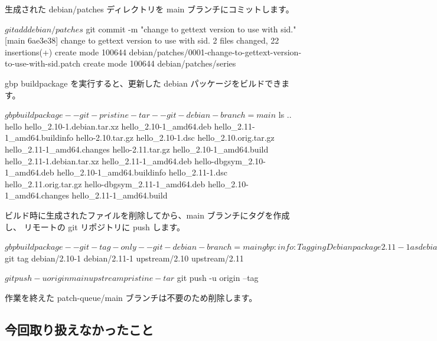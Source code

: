 \documentclass[mingoth,a4paper]{jsarticle}
\begin{document}
生成された debian/patches ディレクトリを main ブランチにコミットします。

\begin{commandline}
$ git add debian/patches
$ git commit -m "change to gettext version to use with sid."
[main 6ae3e38] change to gettext version to use with sid.
 2 files changed, 22 insertions(+)
 create mode 100644 debian/patches/0001-change-to-gettext-version-to-use-with-sid.patch
 create mode 100644 debian/patches/series
\end{commandline}

gbp buildpackage を実行すると、更新した debian パッケージをビルドできます。

\begin{commandline}
$ gbp buildpackage --git-pristine-tar --git-debian-branch=main

$ ls ..
hello                          hello_2.10-1.debian.tar.xz    hello_2.10-1_amd64.deb      hello_2.11-1_amd64.buildinfo
hello-2.10.tar.gz              hello_2.10-1.dsc              hello_2.10.orig.tar.gz      hello_2.11-1_amd64.changes
hello-2.11.tar.gz              hello_2.10-1_amd64.build      hello_2.11-1.debian.tar.xz  hello_2.11-1_amd64.deb
hello-dbgsym_2.10-1_amd64.deb  hello_2.10-1_amd64.buildinfo  hello_2.11-1.dsc            hello_2.11.orig.tar.gz
hello-dbgsym_2.11-1_amd64.deb  hello_2.10-1_amd64.changes    hello_2.11-1_amd64.build
\end{commandline}

ビルド時に生成されたファイルを削除してから、main ブランチにタグを作成し、
リモートの git リポジトリに push します。

\begin{commandline}
$ gbp buildpackage --git-tag-only --git-debian-branch=main
gbp:info: Tagging Debian package 2.11-1 as debian/2.11-1 in git

$ git tag
debian/2.10-1
debian/2.11-1
upstream/2.10
upstream/2.11
\end{commandline}

\begin{commandline}
$ git push -u origin main upstream pristine-tar
$ git push -u origin --tag
\end{commandline}

作業を終えた patch-queue/main ブランチは不要のため削除します。



\subsection{今回取り扱えなかったこと}
\end{document}
